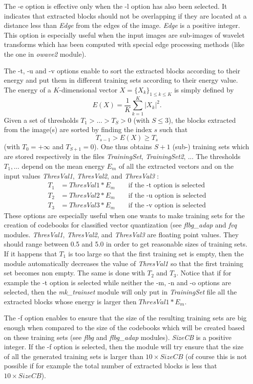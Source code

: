 The -e option is effective only when the -l option has also been selected. 
It indicates that extracted blocks should not be overlapping if they 
are located at a distance less than {\em Edge} from the edges of the 
image. {\em Edge} is a positive integer. This option is especially useful when 
the input images are sub-images of wavelet transforms which has been 
computed with special edge processing methods (like the one in 
{\em owave2} module).

The -t, -u and -v options enable to sort the extracted blocks according 
to their energy and put them in different training sets according 
to their energy value. The energy of a $K$-dimensional vector 
$X=\{X_k\}_{1\leq k\leq K}$ is simply defined by
\[
E(X) = \frac{1}{K} \sum_{k=1}^K |X_k|^2.
\]
Given a set of thresholds $T_1>\ldots >T_S>0$ (with $S\leq 3$), 
the blocks extracted from the image(s) are sorted by finding the index $s$ 
such that 
\[
T_{s-1}> E(X) \geq T_s
\]
(with $T_0 = +\infty$ and $T_{S+1} = 0$). One thus obtains $S+1$ 
(sub-) training sets which are stored respectively in the files 
{\em TrainingSet}, {\em TrainingSet2}, ...
The thresholds $T_1, \ldots$ depend on the mean energy $E_{m}$ of all 
the extracted vectors and on the input values {\em ThresVal1}, 
{\em ThresVal2}, and {\em ThresVal3} :
\begin{eqnarray*} 
T_1 & = ThresVal1 * E_m \;\;\;\;\;\;\; \mbox{if the -t option is selected} \\
T_2 & = ThresVal2 * E_m \;\;\;\;\;\;\; \mbox{if the -u option is selected} \\
T_3 & = ThresVal3 * E_m \;\;\;\;\;\;\; \mbox{if the -v option is selected} 
\end{eqnarray*}
These options are especially useful when one wants to make training sets 
for the creation of codebooks for classified vector 
quantization (see 
{\em flbg\_adap} and {\em fvq} modules. {\em ThresVal1}, {\em ThresVal2}, 
and {\em ThresVal3} are floating point values. They should range 
between 0.5 and 5.0 in order to get reasonable sizes of training sets. 
If it happens that $T_1$ is too large so that the first training set is 
empty, then the module automatically decreases the value of {\em ThresVal1}
so that the first training set becomes non empty. The same is done 
with $T_2$ and $T_3$. Notice that if for example the -t option is selected 
while neither the -m, -n and -o options are selected, then 
the {\em mk\_trainset} module will only put in {\em TrainingSet} file 
all the extracted blocks whose energy is larger then $ThresVal1 * E_m$. 

The -f option enables to ensure that the size of the resulting training sets 
are big enough when compared to the size of the codebooks which will 
be created based on these training sets (see {\em flbg} and {\em flbg\_adap} 
modules). {\em SizeCB} is a positive integer. If the -f option 
is selected, then the module will try ensure that the size of 
all the generated training sets is larger than $10\times SizeCB$ 
(of course this is not possible if for example the total number of extracted 
blocks is less that $10\times SizeCB$). 
